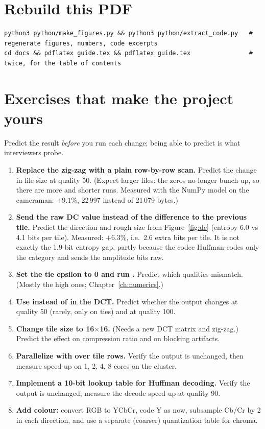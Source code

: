\section{Rebuild this PDF}

\begin{lstlisting}[style=shell]
python3 python/make_figures.py && python3 python/extract_code.py   # regenerate figures, numbers, code excerpts
cd docs && pdflatex guide.tex && pdflatex guide.tex                # twice, for the table of contents
\end{lstlisting}

\section{Exercises that make the project yours}

Predict the result \emph{before} you run each change; being able to predict is what interviewers probe.

\begin{enumerate}
\item \textbf{Replace the zig-zag with a plain row-by-row scan.} Predict the change in file size at quality 50. (Expect larger files: the zeros no longer bunch up, so there are more and shorter runs. Measured with the NumPy model on the cameraman: $+9.1\%$, 22\,997 instead of 21\,079 bytes.)
\item \textbf{Send the raw DC value instead of the difference to the previous tile.} Predict the direction and rough size from Figure~\ref{fig:dc} (entropy 6.0 vs 4.1 bits per tile). Measured: $+6.3\%$, i.e.\ 2.6 extra bits per tile. It is not exactly the 1.9-bit entropy gap, partly because the codec Huffman-codes only the category and sends the amplitude bits raw.
\item \textbf{Set the tie epsilon to 0 and run .} Predict which qualities mismatch. (Mostly the high ones; Chapter~\ref{ch:numerics}.)
\item \textbf{Use  instead of  in the DCT.} Predict whether the output changes at quality 50 (rarely, only on ties) and at quality 100.
\item \textbf{Change tile size to 16$\times$16.} (Needs a new DCT matrix and zig-zag.) Predict the effect on compression ratio and on blocking artifacts.
\item \textbf{Parallelize  with  over tile rows.} Verify the output is unchanged, then measure speed-up on 1, 2, 4, 8 cores on the cluster.
\item \textbf{Implement a 10-bit lookup table for Huffman decoding.} Verify the output is unchanged, measure the decode speed-up at quality 90.
\item \textbf{Add colour:} convert RGB to YCbCr, code Y as now, subsample Cb/Cr by 2 in each direction, and use a separate (coarser) quantization table for chroma.
\end{enumerate}
